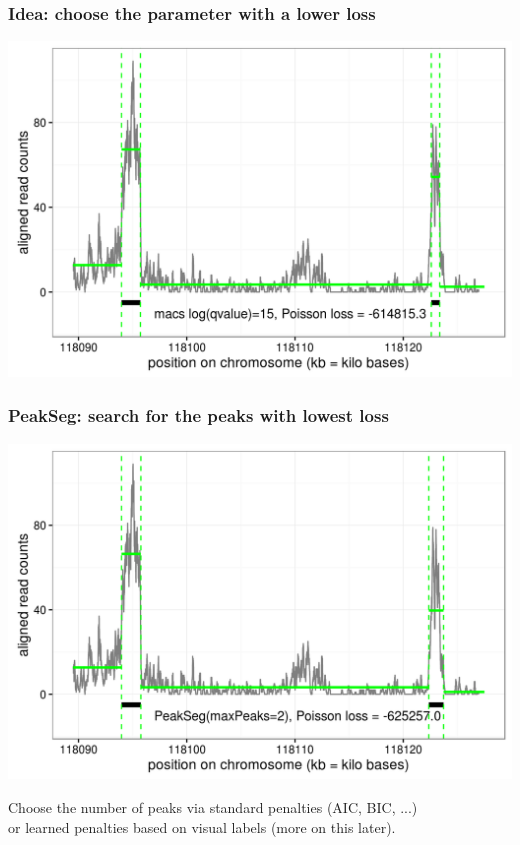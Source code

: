 \documentclass{beamer}
\begin{document}
\begin{frame}
  \frametitle{Idea: choose the parameter with a lower loss}
  \includegraphics[width=1\textwidth]{figure-macs-problem-15.png}
\end{frame}

\begin{frame}
  \frametitle{PeakSeg: search for the peaks with lowest loss}
  \includegraphics[width=1\textwidth]{figure-macs-problem-PeakSeg.png}

  Choose the number of peaks via standard penalties (AIC, BIC,
    ...)\\or learned penalties based on visual labels (more on this later).
\end{frame}
\end{document}
